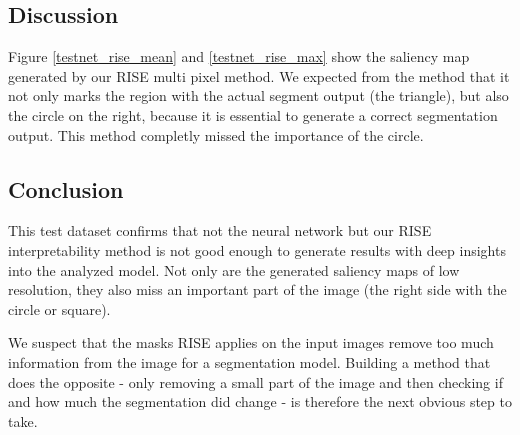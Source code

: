 \subsection{Discussion}
Figure \ref{testnet_rise_mean} and \ref{testnet_rise_max} show the saliency map generated by our RISE multi pixel method. We expected from the method that it not only marks the region with the actual segment output (the triangle), but also the circle on the right, because it is essential to generate a correct segmentation output. This method completly missed the importance of the circle.

\subsection{Conclusion}
This test dataset confirms that not the neural network but our RISE interpretability method is not good enough to generate results with deep insights into the analyzed model. Not only are the generated saliency maps of low resolution, they also miss an important part of the image (the right side with the circle or square).

We suspect that the masks RISE applies on the input images remove too much information from the image for a segmentation model. Building a method that does the opposite - only removing a small part of the image and then checking if and how much the segmentation did change - is therefore the next obvious step to take.
